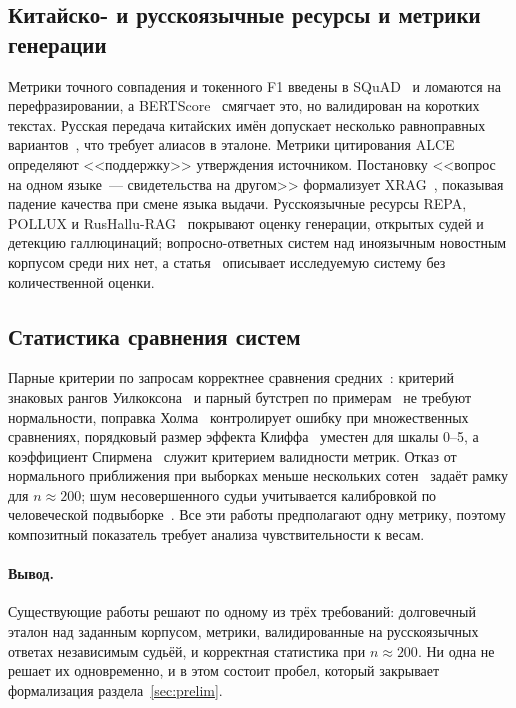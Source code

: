\documentclass{article}
\begin{document}
\subsection{Китайско- и русскоязычные ресурсы и метрики генерации}

Метрики точного совпадения и токенного F1 введены в SQuAD~\cite{rajpurkar2016squad} и ломаются на перефразировании, а BERTScore~\cite{zhang2019bertscore} смягчает это, но валидирован на коротких текстах. Русская передача китайских имён допускает несколько равноправных вариантов~\cite{vashkyavichus2020translation}, что требует алиасов в эталоне. Метрики цитирования ALCE~\cite{gao2023alce} определяют <<поддержку>> утверждения источником. Постановку <<вопрос на одном языке~--- свидетельства на другом>> формализует XRAG~\cite{liu2025xrag}, показывая падение качества при смене языка выдачи. Русскоязычные ресурсы REPA, POLLUX и RusHallu-RAG~\cite{pugachev2025repa,martynov2025pollux,sadkovskii2026rushallu} покрывают оценку генерации, открытых судей и детекцию галлюцинаций; вопросно-ответных систем над иноязычным новостным корпусом среди них нет, а статья~\cite{bagrov2026digital} описывает исследуемую систему без количественной оценки.

\subsection{Статистика сравнения систем}

Парные критерии по запросам корректнее сравнения средних~\cite{hull1993using}: критерий знаковых рангов Уилкоксона~\cite{wilcoxon1945individual} и парный бутстреп по примерам~\cite{efron1979bootstrap} не требуют нормальности, поправка Холма~\cite{holm1979simple} контролирует ошибку при множественных сравнениях, порядковый размер эффекта Клиффа~\cite{cliff1993dominance} уместен для шкалы 0--5, а коэффициент Спирмена~\cite{spearman1904proof} служит критерием валидности метрик. Отказ от нормального приближения при выборках меньше нескольких сотен~\cite{bowyer2025position} задаёт рамку для $n\approx200$; шум несовершенного судьи учитывается калибровкой по человеческой подвыборке~\cite{feng2026noisy}. Все эти работы предполагают одну метрику, поэтому композитный показатель требует анализа чувствительности к весам.

\paragraph{Вывод.} Существующие работы решают по одному из трёх требований: долговечный эталон над заданным корпусом, метрики, валидированные на русскоязычных ответах независимым судьёй, и корректная статистика при $n\approx200$. Ни одна не решает их одновременно, и в этом состоит пробел, который закрывает формализация раздела~\ref{sec:prelim}.
\end{document}
